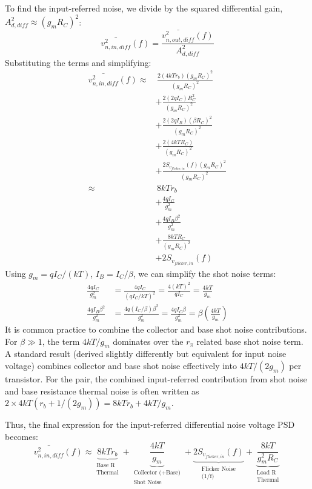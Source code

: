 \documentclass[11pt]{article}
\begin{document}
To find the input-referred noise, we divide by the squared differential gain, $A_{d,diff}^2 \approx (g_m R_C)^2$:
\begin{equation}
    \bar{v^2_{n,in,diff}}(f) = \frac{\bar{v^2_{n,out,diff}}(f)}{A_{d,diff}^2}
\end{equation}
Substituting the terms and simplifying:
\begin{align*}
    \bar{v^2_{n,in,diff}}(f) \approx & \, \frac{2 (4 k T r_b) (g_m R_C)^2}{(g_m R_C)^2} \\
                                      & + \frac{2 (2 q I_C) R_C^2}{(g_m R_C)^2} \\
                                      & + \frac{2 (2 q I_B) (\beta R_C)^2}{(g_m R_C)^2} \\
                                      & + \frac{2 (4 k T R_C)}{(g_m R_C)^2} \\
                                      & + \frac{2 S_{v_{flicker,in}}(f) (g_m R_C)^2}{(g_m R_C)^2} \\
%
    \approx & \, 8 k T r_b \\
             & + \frac{4 q I_C}{g_m^2} \\
             & + \frac{4 q I_B \beta^2}{g_m^2} \\
             & + \frac{8 k T R_C}{(g_m R_C)^2} \\
             & + 2 S_{v_{flicker,in}}(f)
\end{align*}
Using $g_m = q I_C / (k T)$, $I_B = I_C / \beta$, we can simplify the shot noise terms:
\begin{align*}
    \frac{4 q I_C}{g_m^2} &= \frac{4 q I_C}{(q I_C / k T)^2} = \frac{4 (k T)^2}{q I_C} = \frac{4 k T}{g_m} \\
    \frac{4 q I_B \beta^2}{g_m^2} &= \frac{4 q (I_C/\beta) \beta^2}{g_m^2} = \frac{4 q I_C \beta}{g_m^2} = \beta \left( \frac{4 k T}{g_m} \right)
\end{align*}
It is common practice to combine the collector and base shot noise contributions. For $\beta \gg 1$, the term $4kT/g_m$ dominates over the $r_{\pi}$ related base shot noise term. A standard result (derived slightly differently but equivalent for input noise voltage) combines collector and base shot noise effectively into $4kT/(2g_m)$ per transistor. For the pair, the combined input-referred contribution from shot noise and base resistance thermal noise is often written as $2 \times 4kT(r_b + 1/(2g_m)) = 8kT r_b + 4kT/g_m$.

Thus, the final expression for the input-referred differential noise voltage PSD becomes:
\begin{equation}
\label{eq:final_noise}
\boxed{
\bar{v^2_{n,in,diff}}(f) \approx \underbrace{8 k T r_b}_{\substack{\text{Base R} \\ \text{Thermal}}} + \underbrace{\frac{4 k T}{g_m}}_{\substack{\text{Collector (+Base)} \\ \text{Shot Noise}}} + \underbrace{2 S_{v_{flicker,in}}(f)}_{\substack{\text{Flicker Noise} \\ \text{(1/f)}}} + \underbrace{\frac{8 k T}{g_m^2 R_C}}_{\substack{\text{Load R} \\ \text{Thermal}}}
}
\end{equation}
\end{document}
